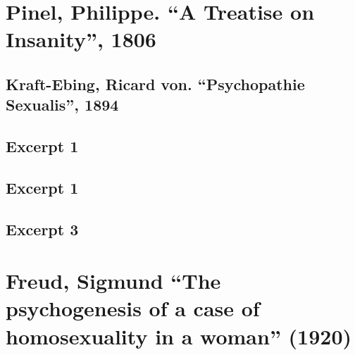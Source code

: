 \begin{appendices}
\let\svaddcontentsline\addcontentsline
\renewcommand\addcontentsline[3]{%
 \ifthenelse{\equal{#1}{lof}}{}%
 {\ifthenelse{\equal{#1}{lot}}{}{\svaddcontentsline{#1}{#2}{#3}}}}



\chapter{Pinel, Philippe. ``A Treatise on Insanity'', 1806}
\label{pinelphilippe.atreatiseoninsanity1806}

\label{app: Pinel}


\section{Kraft-Ebing, Ricard von. ``Psychopathie Sexualis'', 1894}
\label{kraft-ebingricardvon.psychopathiesexualis1894}

\section{Excerpt 1}
\label{excerpt1}

\label{app: KraftEbbing1}


\section{Excerpt 1}
\label{excerpt1}

\label{app: KraftEbbing2}


\section{Excerpt 3}
\label{excerpt3}

\label{app: KraftEbbing3}


\chapter{Freud, Sigmund ``The psychogenesis of a case of homosexuality in a woman'' (1920)}
\label{freudsigmundthepsychogenesisofacaseofhomosexualityinawoman1920}


\end{appendices}
